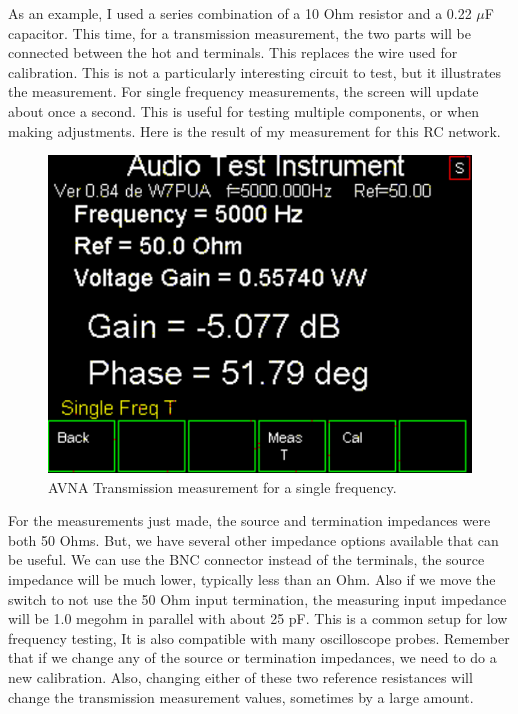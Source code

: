 %
As an example, I used a series combination of a 10 Ohm resistor and a 0.22 $\mu$F capacitor.  This time, for a transmission measurement, the two parts will be connected between the hot  and  terminals. This replaces the wire used for calibration.  This is not a particularly interesting circuit to test, but it illustrates the measurement.  For single frequency measurements, the screen will update about once a second.  This is useful for testing multiple components, or when making adjustments.  Here is the result of my measurement for this RC network.
\begin{figure}[H]
\begin{center}
\includegraphics[scale=0.75]{./images/AVNA_047.pdf}
\caption{AVNA Transmission measurement for a single frequency.}
\label{AVNA_047-label}
\end{center}
\end{figure}
%
For the measurements just made, the source and termination impedances were both 50 Ohms. But, we have several other impedance options available that can be useful.  We can use the BNC connector instead of the terminals, the source impedance will be much lower, typically less than an Ohm.  Also if we move the switch to not use the 50 Ohm input termination, the measuring input impedance will be 1.0 megohm in parallel with about 25 pF.  This is a common setup for low frequency testing,  It is also compatible with many oscilloscope probes.  Remember that if we change any of the source or termination impedances, we need to do a new calibration.  Also, changing either of these two reference resistances will change the transmission measurement values, sometimes by a large amount.

